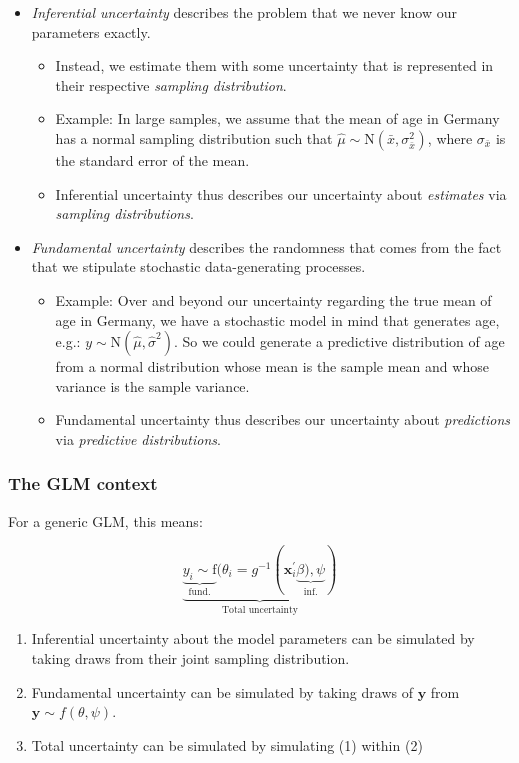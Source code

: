 \documentclass[
  11pt,
]{article}
\providecommand{\tightlist}{%
  \setlength{\itemsep}{0pt}\setlength{\parskip}{0pt}}
\begin{document}
\begin{itemize}
\tightlist
\item
  \emph{Inferential uncertainty} describes the problem that we never know our parameters exactly.

  \begin{itemize}
  \tightlist
  \item
    Instead, we estimate them with some uncertainty that is represented in their respective \emph{sampling distribution}.
  \item
    Example: In large samples, we assume that the mean of age in Germany has a normal sampling distribution such that \(\hat \mu \sim \text{N}(\bar x, \sigma_{\bar x}^2)\), where \(\sigma_{\bar x}\) is the standard error of the mean.
  \item
    Inferential uncertainty thus describes our uncertainty about \emph{estimates} via \emph{sampling distributions}.
  \end{itemize}
\item
  \emph{Fundamental uncertainty} describes the randomness that comes from the fact that we stipulate stochastic data-generating processes.

  \begin{itemize}
  \tightlist
  \item
    Example: Over and beyond our uncertainty regarding the true mean of age in Germany, we have a stochastic model in mind that generates age, e.g.: \(y \sim \text{N}(\hat \mu, \hat\sigma^2)\). So we could generate a predictive distribution of age from a normal distribution whose mean is the sample mean and whose variance is the sample variance.
  \item
    Fundamental uncertainty thus describes our uncertainty about \emph{predictions} via \emph{predictive distributions}.
  \end{itemize}
\end{itemize}

\hypertarget{the-glm-context}{%
\subsubsection{The GLM context}\label{the-glm-context}}

For a generic GLM, this means:

\[\underbrace{\underbrace{y_i \sim \text{f}}_{\text{fund.}}(\theta_i = g^{-1}(\mathbf{x}_i^{\prime} \underbrace{\beta), \psi}_{\text{inf.}})}_{\text{Total uncertainty}}\]

\begin{enumerate}
\def\labelenumi{\arabic{enumi}.}
\tightlist
\item
  Inferential uncertainty about the model parameters can be simulated by taking draws from their joint sampling distribution.
\item
  Fundamental uncertainty can be simulated by taking draws of \(\mathbf{y}\) from \(\mathbf{y} \sim f(\theta, \psi)\).
\item
  Total uncertainty can be simulated by simulating (1) within (2)
\end{enumerate}
\end{document}
